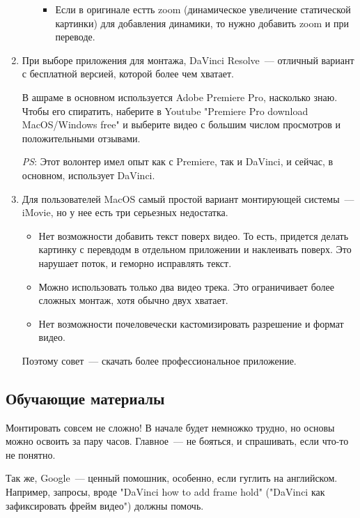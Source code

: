 \documentclass[
a4paper, %
12pt, %
article,
onecolumn, %
openany, %
]{memoir}
\begin{document}
\begin{enumerate}
\begin{itemize}
\begin{itemize}
            \item Если в оригинале естть zoom (динамическое увеличение
                статической картинки) для добавления динамики, то нужно
                добавить zoom и при переводе.

        \end{itemize}
    \end{itemize}
\item При выборе приложения для монтажа, DaVinci Resolve~---
    отличный вариант с бесплатной версией, которой более чем хватает. 

В ашраме в основном используется Adobe Premiere Pro, насколько знаю. 
Чтобы его спиратить, наберите в Youtube "Premiere Pro download
MacOS/Windows free" и выберите видео с большим числом просмотров и положительными отзывами.

\emph{PS}: Этот волонтер имел опыт как с Premiere, так и DaVinci, и
сейчас, в основном, использует DaVinci.
\item Для пользователей MacOS самый простой вариант монтирующей системы~--- 
    iMovie, но у нее есть три серьезных недостатка.
    \begin{itemize}
    \item Нет возможности добавить текст поверх видео. То есть, придется делать
        картинку с перевдодм в отдельном приложении и наклеивать поверх.
        Это нарушает поток, и геморно исправлять текст.
    \item Можно использовать только два видео трека. Это ограничивает более 
        сложных монтаж, хотя обычно двух хватает.
    \item Нет возможности почеловечески кастомизировать разрешение и формат видео. 
\end{itemize}
    Поэтому совет~--- скачать более профессиональное приложение. 
\end{enumerate}





\subsection{Обучающие материалы}

Монтировать совсем не сложно! В начале будет немножко трудно, но основы можно 
освоить за пару часов. Главное~--- не бояться, и спрашивать, если что-то не понятно.

Так же, Google~--- ценный помошник, особенно, если гуглить на английском.
Например, запросы, вроде 
"DaVinci how to add frame hold" ("DaVinci как зафиксировать фрейм видео")
должны помочь.
\end{document}

